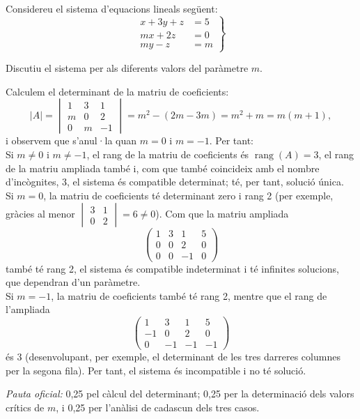 Considereu el sistema d'equacions lineals següent:
\[
\left.\begin{aligned}
x+3y+z&=5\\
mx+2z&=0\\
my-z&=m
\end{aligned}\right\}
\]

\begin{apartats}

Discutiu el sistema per als diferents valors del paràmetre $m$.

\begin{solucio}
Calculem el determinant de la matriu de coeficients:
\[
|A|=\begin{vmatrix}1&3&1\\m&0&2\\0&m&-1\end{vmatrix}=m^2-(2m-3m)=m^2+m=m(m+1),
\]
i observem que s'anul·la quan $m=0$ i $m=-1$. Per tant:\\
Si $m\neq0$ i $m\neq-1$, el rang de la matriu de coeficients és $\operatorname{rang}(A)=3$, el rang de la
matriu ampliada també i, com que també coincideix amb el nombre d'incògnites, 3, el sistema és compatible
determinat; té, per tant, solució única.\\
Si $m=0$, la matriu de coeficients té determinant zero i rang 2 (per exemple, gràcies al menor
$\begin{vmatrix}3&1\\0&2\end{vmatrix}=6\neq0$). Com que la matriu ampliada
\[
\begin{pmatrix}1&3&1&5\\0&0&2&0\\0&0&-1&0\end{pmatrix}
\]
també té rang 2, el sistema és compatible indeterminat i té infinites solucions, que dependran d'un
paràmetre.\\
Si $m=-1$, la matriu de coeficients també té rang 2, mentre que el rang de l'ampliada
\[
\begin{pmatrix}1&3&1&5\\-1&0&2&0\\0&-1&-1&-1\end{pmatrix}
\]
és 3 (desenvolupant, per exemple, el determinant de les tres darreres columnes per la segona fila). Per tant,
el sistema és incompatible i no té solució.

\textit{Pauta oficial:} 0,25 pel càlcul del determinant; 0,25 per la determinació dels valors crítics de $m$, i
0,25 per l'anàlisi de cadascun dels tres casos.
\end{solucio}


\end{apartats}
